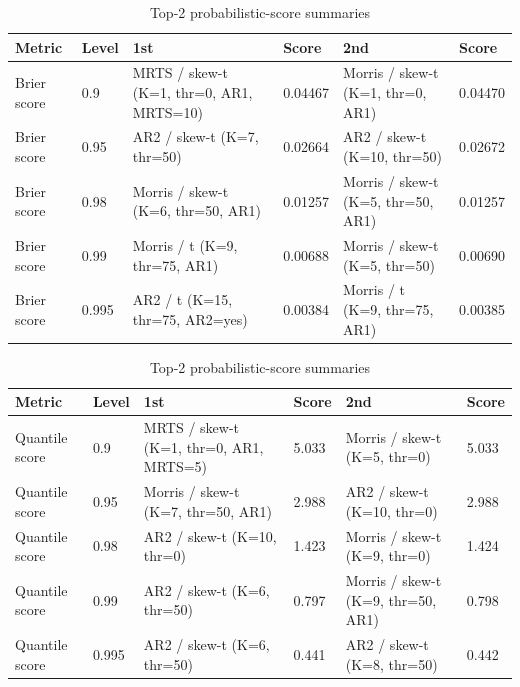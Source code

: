 \documentclass[11pt]{article}
\begin{document}
\begin{landscape}
\scriptsize
\begin{longtable}{@{}P{2cm}P{1.2cm}P{6.4cm}P{2.1cm}P{5.2cm}P{2.1cm}@{}}
\caption{Top-2 probabilistic-score summaries}\\
\toprule
Metric & Level & 1st & Score & 2nd & Score \\
\midrule
\endfirsthead
\bottomrule
\endlastfoot
Brier score & 0.9 & MRTS / skew-t (K=1, thr=0, AR1, MRTS=10) & 0.04467 & Morris / skew-t (K=1, thr=0, AR1) & 0.04470 \\
Brier score & 0.95 & AR2 / skew-t (K=7, thr=50) & 0.02664 & AR2 / skew-t (K=10, thr=50) & 0.02672 \\
Brier score & 0.98 & Morris / skew-t (K=6, thr=50, AR1) & 0.01257 & Morris / skew-t (K=5, thr=50, AR1) & 0.01257 \\
Brier score & 0.99 & Morris / t (K=9, thr=75, AR1) & 0.00688 & Morris / skew-t (K=5, thr=50) & 0.00690 \\
Brier score & 0.995 & AR2 / t (K=15, thr=75, AR2=yes) & 0.00384 & Morris / t (K=9, thr=75, AR1) & 0.00385 \\
\end{longtable}
\end{landscape}


\begin{landscape}
\scriptsize
\begin{longtable}{@{}P{2cm}P{1.2cm}P{6.4cm}P{2.1cm}P{5.2cm}P{2.1cm}@{}}
\caption{Top-2 probabilistic-score summaries}\\
\toprule
Metric & Level & 1st & Score & 2nd & Score \\
\midrule
\endfirsthead
\bottomrule
\endlastfoot
Quantile score & 0.9 & MRTS / skew-t (K=1, thr=0, AR1, MRTS=5) & 5.033 & Morris / skew-t (K=5, thr=0) & 5.033 \\
Quantile score & 0.95 & Morris / skew-t (K=7, thr=50, AR1) & 2.988 & AR2 / skew-t (K=10, thr=0) & 2.988 \\
Quantile score & 0.98 & AR2 / skew-t (K=10, thr=0) & 1.423 & Morris / skew-t (K=9, thr=0) & 1.424 \\
Quantile score & 0.99 & AR2 / skew-t (K=6, thr=50) & 0.797 & Morris / skew-t (K=9, thr=50, AR1) & 0.798 \\
Quantile score & 0.995 & AR2 / skew-t (K=6, thr=50) & 0.441 & AR2 / skew-t (K=8, thr=50) & 0.442 \\
\end{longtable}
\end{landscape}
\end{document}
